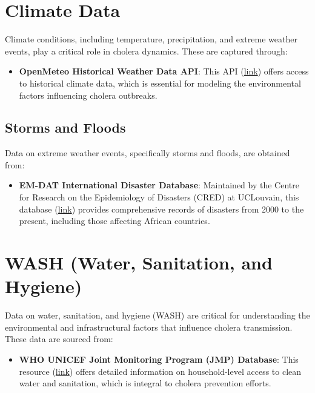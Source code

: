 \documentclass[
]{book}
\providecommand{\tightlist}{%
  \setlength{\itemsep}{0pt}\setlength{\parskip}{0pt}}
\begin{document}
\section{Climate Data}\label{climate-data}

Climate conditions, including temperature, precipitation, and extreme weather events, play a critical role in cholera dynamics. These are captured through:

\begin{itemize}
\tightlist
\item
  \textbf{OpenMeteo Historical Weather Data API}: This API (\href{https://open-meteo.com/en/docs/historical-weather-api}{link}) offers access to historical climate data, which is essential for modeling the environmental factors influencing cholera outbreaks.
\end{itemize}

\subsection{Storms and Floods}\label{storms-and-floods}

Data on extreme weather events, specifically storms and floods, are obtained from:

\begin{itemize}
\tightlist
\item
  \textbf{EM-DAT International Disaster Database}: Maintained by the Centre for Research on the Epidemiology of Disasters (CRED) at UCLouvain, this database (\href{https://www.emdat.be/}{link}) provides comprehensive records of disasters from 2000 to the present, including those affecting African countries.
\end{itemize}

\section{WASH (Water, Sanitation, and Hygiene)}\label{wash-water-sanitation-and-hygiene}

Data on water, sanitation, and hygiene (WASH) are critical for understanding the environmental and infrastructural factors that influence cholera transmission. These data are sourced from:

\begin{itemize}
\tightlist
\item
  \textbf{WHO UNICEF Joint Monitoring Program (JMP) Database}: This resource (\href{https://washdata.org/data/household}{link}) offers detailed information on household-level access to clean water and sanitation, which is integral to cholera prevention efforts.
\end{itemize}
\end{document}
